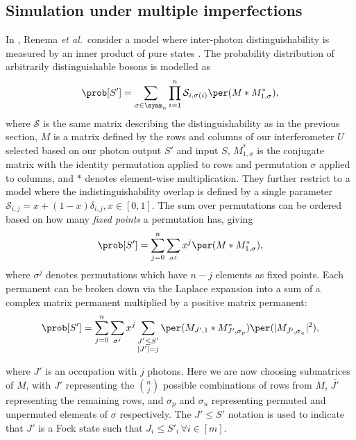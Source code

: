 \subsection{Simulation under multiple imperfections}
\label{sec:renema-review}

In \cite{renema2018, renema2018loss}, Renema \textit{et al.}\ consider a model where inter-photon distinguishability is measured by an inner product of pure states \cite{tamma2014, deguise2014, shchesnovich2015, rohde2015, tamma2015, tichy2015}. 
The probability distribution of arbitrarily distinguishable bosons is modelled as
\begin{equation}
\prob[S'] = \sum_{\sigma\in\symm_n}\prod_{i=1}^n\mathcal{S}_{i,\sigma(i)}\per(M*M^*_{1,\sigma}) ,
\end{equation}
where $\mathcal{S}$ is the same matrix describing the distinguishability as in the previous section, $M$ is a matrix defined by the rows and columns of our interferometer $U$ selected based on our photon output $S'$ and input $S$, $M^*_{1,\sigma}$ is the conjugate matrix with the identity permutation applied to rows and permutation $\sigma$ applied to columns, and $*$ denotes element-wise multiplication. 
They further restrict to a model where the indistinguishability overlap is defined by a single parameter $\mathcal{S}_{i,j} = x + (1-x)\delta_{i,j}, x \in [0,1]$.
The sum over permutations can be ordered based on how many \emph{fixed points} a permutation has, giving
\begin{equation}
\prob[S'] = \sum_{j=0}^n\sum_{\sigma^j}x^j\per(M*M^*_{1,\sigma}) , \label{eqn:renema-state}
\end{equation}
where $\sigma^j$ denotes permutations which have $n-j$ elements as fixed points.
Each permanent can be broken down via the Laplace expansion into a sum of a complex matrix permanent multiplied by a positive matrix permanent:
\begin{equation}
\prob[S'] = \sum_{j=0}^n\sum_{\sigma^j}x^j\sum_{\substack{J'\leq S'\\|J'|=j}}\per(M_{J',1}*M^*_{J',\sigma_p})\per(|M_{\bar{J'},\sigma_u}|^2) ,
\end{equation}

\noindent where $J'$ is an occupation with $j$ photons. Here we are now choosing submatrices of $M$, with $J'$ representing the $\binom{n}{j}$ possible combinations of rows from $M$, $\bar{J'}$ representing the remaining rows, and $\sigma_p$ and $\sigma_u$  representing permuted and unpermuted elements of $\sigma$ respectively.
The $J' \leq S'$ notation is used to indicate that $J'$ is a Fock state such that $J_i\leq S'_i \,\forall i\in[m]$.

